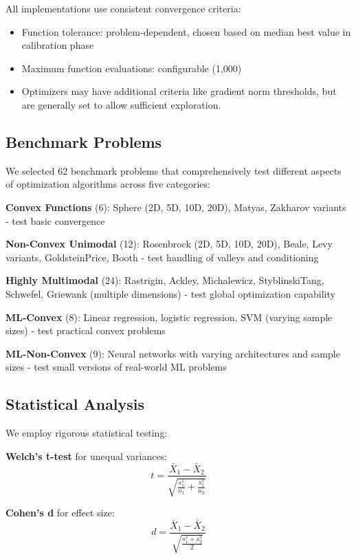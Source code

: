 All implementations use consistent convergence criteria:

\begin{itemize}
\tightlist
\item
  Function tolerance: problem-dependent, chosen based on median best value in calibration phase
\item
  Maximum function evaluations: configurable (1,000)
\item
  Optimizers may have additional criteria like gradient norm thresholds, but are generally set to allow sufficient exploration.
\end{itemize}

\hypertarget{benchmark-problems}{%
\subsection{Benchmark Problems}\label{benchmark-problems}}

We selected 62 benchmark problems that comprehensively test different aspects of optimization algorithms across five categories:

\textbf{Convex Functions} (6): Sphere (2D, 5D, 10D, 20D), Matyas, Zakharov variants - test basic convergence

\textbf{Non-Convex Unimodal} (12): Rosenbrock (2D, 5D, 10D, 20D), Beale, Levy variants, GoldsteinPrice, Booth - test handling of valleys and conditioning

\textbf{Highly Multimodal} (24): Rastrigin, Ackley, Michalewicz, StyblinskiTang, Schwefel, Griewank (multiple dimensions) - test global optimization capability

\textbf{ML-Convex} (8): Linear regression, logistic regression, SVM (varying sample sizes) - test practical convex problems

\textbf{ML-Non-Convex} (9): Neural networks with varying architectures and sample sizes - test small versions of real-world ML problems

\hypertarget{statistical-analysis}{%
\subsection{Statistical Analysis}\label{statistical-analysis}}

We employ rigorous statistical testing:

\textbf{Welch's t-test} for unequal variances:
\[t = \frac{\bar{X}_1 - \bar{X}_2}{\sqrt{\frac{s_1^2}{n_1} + \frac{s_2^2}{n_2}}}\]

\textbf{Cohen's d} for effect size:
\[d = \frac{\bar{X}_1 - \bar{X}_2}{\sqrt{\frac{s_1^2 + s_2^2}{2}}}\]

